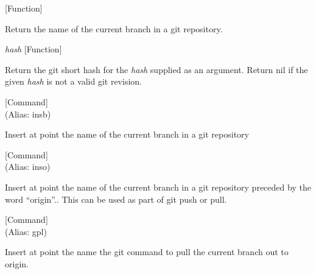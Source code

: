 \vspace{1em}
\noindent
{}
\usebox{\funcname}
 \hfill [Function]

\begin{doc-string}
Return the name of the current branch in a git repository.
\end{doc-string}

\vspace{1em}
\noindent
{}
\usebox{\funcname}\emph{hash}
 \hfill [Function]

\begin{doc-string}
Return the git short hash for the \emph{hash} supplied as an argument.  Return nil
if the given \emph{hash} is not a valid git revision.
\end{doc-string}

\vspace{1em}
\noindent
{}
\usebox{\funcname}
 \hfill [Command]\\%
 (Alias: insb)

\begin{doc-string}
Insert at point the name of the current branch in a git repository
\end{doc-string}

\vspace{1em}
\noindent
{}
\usebox{\funcname}
 \hfill [Command]\\%
 (Alias: inso)

\begin{doc-string}
Insert at point the name of the current branch in a git repository preceded by the
word ``origin''..  This can be used as part of git push or pull.
\end{doc-string}

\vspace{1em}
\noindent
{}
\usebox{\funcname}
 \hfill [Command]\\%
 (Alias: gpl)

\begin{doc-string}
Insert at point the name the git command to pull the current branch out
to origin.
\end{doc-string}

